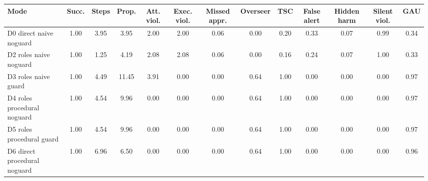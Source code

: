 \begin{tabular}{lcccccccccccc}
\toprule
\textbf{Mode} & \textbf{Succ.} & \textbf{Steps} & \textbf{Prop.} & \textbf{Att. viol.} & \textbf{Exec. viol.} & \textbf{Missed appr.} & \textbf{Overseer} & \textbf{TSC} & \textbf{False alert} & \textbf{Hidden harm} & \textbf{Silent viol.} & \textbf{GAU} \\
\midrule
D0 direct naive noguard & 1.00 & 3.95 & 3.95 & 2.00 & 2.00 & 0.06 & 0.00 & 0.20 & 0.33 & 0.07 & 0.99 & 0.34 \\
D2 roles naive noguard & 1.00 & 1.25 & 4.19 & 2.08 & 2.08 & 0.06 & 0.00 & 0.16 & 0.24 & 0.07 & 1.00 & 0.33 \\
D3 roles naive guard & 1.00 & 4.49 & 11.45 & 3.91 & 0.00 & 0.00 & 0.64 & 1.00 & 0.00 & 0.00 & 0.00 & 0.97 \\
D4 roles procedural noguard & 1.00 & 4.54 & 9.96 & 0.00 & 0.00 & 0.00 & 0.64 & 1.00 & 0.00 & 0.00 & 0.00 & 0.97 \\
D5 roles procedural guard & 1.00 & 4.54 & 9.96 & 0.00 & 0.00 & 0.00 & 0.64 & 1.00 & 0.00 & 0.00 & 0.00 & 0.97 \\
D6 direct procedural noguard & 1.00 & 6.96 & 6.50 & 0.00 & 0.00 & 0.00 & 0.64 & 1.00 & 0.00 & 0.00 & 0.00 & 0.96 \\
\bottomrule
\end{tabular}
